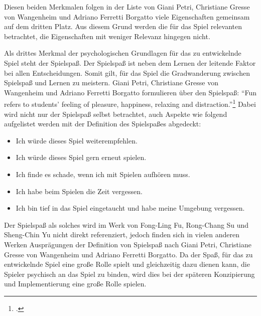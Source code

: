 	Diesen beiden Merkmalen folgen in der Liste von Giani Petri, Christiane Gresse von Wangenheim und Adriano Ferretti Borgatto viele Eigenschaften gemeinsam auf dem dritten Platz. Aus diesem Grund werden die für das Spiel relevanten betrachtet, die Eigenschaften mit weniger Relevanz hingegen nicht.

	Als drittes Merkmal der psychologischen Grundlagen für das zu entwickelnde Spiel steht der Spielspaß. Der Spielspaß ist neben dem Lernen der leitende Faktor bei allen Entscheidungen. Somit gilt, für das Spiel die Gradwanderung zwischen Spielspaß und Lernen zu meistern.
	Giani Petri, Christiane Gresse von Wangenheim und Adriano Ferretti Borgatto formulieren über den Spielspaß:
	\enquote{Fun refers to students' feeling of pleasure, happiness, relaxing and distraction.}\footcite{psych3}
	Dabei wird nicht nur der Spielspaß selbst betrachtet, auch Aspekte wie folgend aufgelistet werden mit der Definition des Spielspaßes abgedeckt:
	\begin{itemize}
		\item{Ich würde dieses Spiel weiterempfehlen.}
		\item{Ich würde dieses Spiel gern erneut spielen.}
		\item{Ich finde es schade, wenn ich mit Spielen aufhören muss.}
		\item{Ich habe beim Spielen die Zeit vergessen.}
		\item{Ich bin tief in das Spiel eingetaucht und habe meine Umgebung vergessen.}
	\end{itemize}
	Der Spielspaß als solches wird im Werk von Fong-Ling Fu, Rong-Chang Su und Sheng-Chin Yu nicht direkt referenziert, jedoch finden sich in vielen anderen Werken Ausprägungen der Definition von Spielspaß nach Giani Petri, Christiane Gresse von Wangenheim und Adriano Ferretti Borgatto.
	Da der Spaß, für das zu entwickelnde Spiel eine große Rolle spielt und gleichzeitig dazu dienen kann, die Spieler psychisch an das Spiel zu binden, wird dies bei der späteren Konzipierung und Implementierung eine große Rolle spielen.

